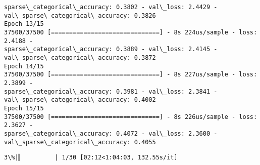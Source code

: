 \documentclass[11pt]{article}
\begin{document}
\begin{Verbatim}[commandchars=\\\{\}]
sparse\_categorical\_accuracy: 0.3802 - val\_loss: 2.4429 -
val\_sparse\_categorical\_accuracy: 0.3826
Epoch 13/15
37500/37500 [==============================] - 8s 224us/sample - loss: 2.4188 -
sparse\_categorical\_accuracy: 0.3889 - val\_loss: 2.4145 -
val\_sparse\_categorical\_accuracy: 0.3872
Epoch 14/15
37500/37500 [==============================] - 8s 227us/sample - loss: 2.3899 -
sparse\_categorical\_accuracy: 0.3981 - val\_loss: 2.3841 -
val\_sparse\_categorical\_accuracy: 0.4002
Epoch 15/15
37500/37500 [==============================] - 8s 226us/sample - loss: 2.3627 -
sparse\_categorical\_accuracy: 0.4072 - val\_loss: 2.3600 -
val\_sparse\_categorical\_accuracy: 0.4055
    \end{Verbatim}

    \begin{Verbatim}[commandchars=\\\{\}]
  3\%|▎         | 1/30 [02:12<1:04:03, 132.55s/it]
    \end{Verbatim}
\end{document}
